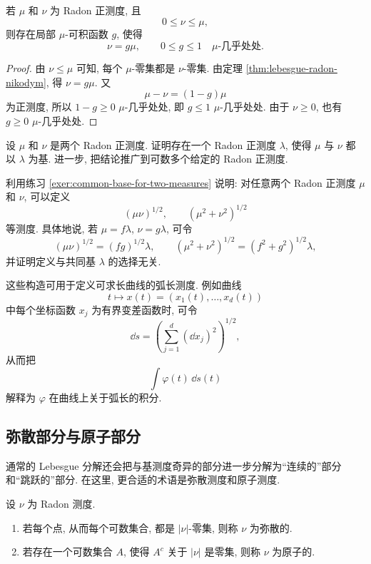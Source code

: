 \begin{cor}\label{cor:dominated-measure-radon-nikodym-density-bound}
	若 \(\mu\) 和 \(\nu\) 为 Radon 正测度, 且
	\[
	0\leq \nu\leq\mu,
	\]
	则存在局部 \(\mu\)-可积函数 \(g\), 使得
	\[
	\nu=g\mu,
	\qquad
	0\leq g\leq1\quad \mu\text{-几乎处处}.
	\]
\end{cor}

\begin{proof}
	由 \(\nu\leq\mu\) 可知, 每个 \(\mu\)-零集都是 \(\nu\)-零集. 由定理 \ref{thm:lebesgue-radon-nikodym}, 得 \(\nu=g\mu\). 又
	\[
	\mu-\nu=(1-g)\mu
	\]
	为正测度, 所以 \(1-g\geq0\) \(\mu\)-几乎处处, 即 \(g\leq1\) \(\mu\)-几乎处处. 由于 \(\nu\geq0\), 也有 \(g\geq0\) \(\mu\)-几乎处处.
\end{proof}

\begin{exer}\label{exer:common-base-for-two-measures}
	设 \(\mu\) 和 \(\nu\) 是两个 Radon 正测度. 证明存在一个 Radon 正测度 \(\lambda\), 使得 \(\mu\) 与 \(\nu\) 都以 \(\lambda\) 为基. 进一步, 把结论推广到可数多个给定的 Radon 正测度.
\end{exer}

\begin{exer}\label{exer:measure-geometric-mean}
	利用练习 \ref{exer:common-base-for-two-measures} 说明: 对任意两个 Radon 正测度 \(\mu\) 和 \(\nu\), 可以定义
	\[
	(\mu\nu)^{1/2},
	\qquad
	(\mu^2+\nu^2)^{1/2}
	\]
	等测度. 具体地说, 若 \(\mu=f\lambda\), \(\nu=g\lambda\), 可令
	\[
	(\mu\nu)^{1/2}=(fg)^{1/2}\lambda,
	\qquad
	(\mu^2+\nu^2)^{1/2}=(f^2+g^2)^{1/2}\lambda,
	\]
	并证明定义与共同基 \(\lambda\) 的选择无关.
	
	这些构造可用于定义可求长曲线的弧长测度. 例如曲线
	\[
	t\longmapsto x(t)=(x_1(t),\ldots,x_d(t))
	\]
	中每个坐标函数 \(x_j\) 为有界变差函数时, 可令
	\[
	\dd s=\left(\sum_{j=1}^d(\dd x_j)^2\right)^{1/2},
	\]
	从而把
	\[
	\int \varphi(t)\,\dd s(t)
	\]
	解释为 \(\varphi\) 在曲线上关于弧长的积分.
\end{exer}

\subsection{弥散部分与原子部分}

通常的 Lebesgue 分解还会把与基测度奇异的部分进一步分解为``连续的''部分和``跳跃的''部分. 在这里, 更合适的术语是弥散测度和原子测度.

\begin{defn}[弥散测度与原子测度]
	\label{def:diffuse-and-atomic-measure}
	设 \(\nu\) 为 Radon 测度.
	\begin{enumerate}
		\item 若每个点, 从而每个可数集合, 都是 \(|\nu|\)-零集, 则称 \(\nu\) 为弥散的.
		\item 若存在一个可数集合 \(A\), 使得 \(A^c\) 关于 \(|\nu|\) 是零集, 则称 \(\nu\) 为原子的.
	\end{enumerate}
\end{defn}

